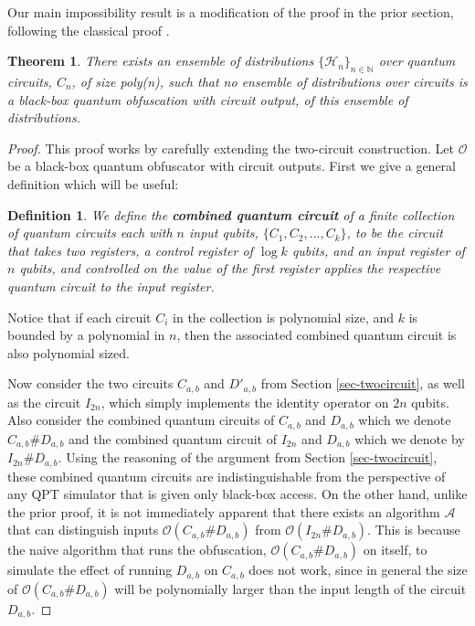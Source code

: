 \documentclass[11pt]{article}
\numberwithin{equation}{section}
\newtheorem{theorem}{Theorem}
\newtheorem{definition}{Definition}
\newcommand{\algo}{\mathcal}
\begin{document}
{Our main impossibility result is a modification of the proof in the prior section, following the classical proof \cite{BGIRSVY12}.
\begin{theorem}
There exists an ensemble of distributions $\lbrace\mathcal{H}_n\rbrace_{n\in\mathbb{N}}$ over quantum circuits, $C_n$, of size poly(n), such that no ensemble of distributions over circuits is a black-box quantum obfuscation with circuit output, of this ensemble of distributions.
\end{theorem}
\begin{proof}
This proof works by carefully extending the two-circuit construction.  Let $\mathcal O$ be a black-box quantum obfuscator with circuit outputs.
First we give a general definition which will be useful:
\begin{definition}We define the {\bf combined quantum circuit} of a finite collection of quantum circuits each with $n$ input qubits, $\lbrace C_1,C_2,...,C_k \rbrace$, to be the circuit that takes two registers, a control register of $\log{k}$ qubits, and an input register of $n$ qubits, and controlled on the value of the first register applies the respective quantum circuit to the input register.   
\end{definition}

Notice that if each circuit $C_i$ in the collection is polynomial size, and $k$ is bounded by a polynomial in $n$, then the associated combined quantum circuit is also polynomial sized.   

Now consider the two circuits  $C_{a,b}$ and $D'_{a,b}$ from Section \ref{sec-twocircuit}, as well as the circuit $I_{2n}$, which simply implements the identity operator on $2n$ qubits.  Also consider the combined quantum circuits of $C_{a,b}$ and $D_{a,b}$ which we denote $C_{a,b}\#D_{a,b}$ and the combined quantum circuit of $I_{2n}$ and $D_{a,b}$ which we denote by $I_{2n}\#D_{a,b}$.  Using the reasoning of the argument from Section \ref{sec-twocircuit}, these combined quantum circuits are indistinguishable from the perspective of any QPT simulator that is given only black-box access.  On the other hand, unlike the prior proof, it is not immediately apparent that there exists an algorithm $\algo{A}$ that can distinguish inputs $\algo{O}(C_{a,b}\#D_{a,b})$ from $\algo{O}(I_{2n}\#D_{a,b})$.  This is because the naive algorithm that runs the obfuscation, $\algo{O}(C_{a,b}\#D_{a,b})$ on itself, to simulate the effect of running $D_{a,b}$ on $C_{a,b}$ does not work, since in general the size of $\algo{O}(C_{a,b}\#D_{a,b})$ will be  polynomially larger than the input length of the circuit $D_{a,b}$.


\end{proof}}
\end{document}
